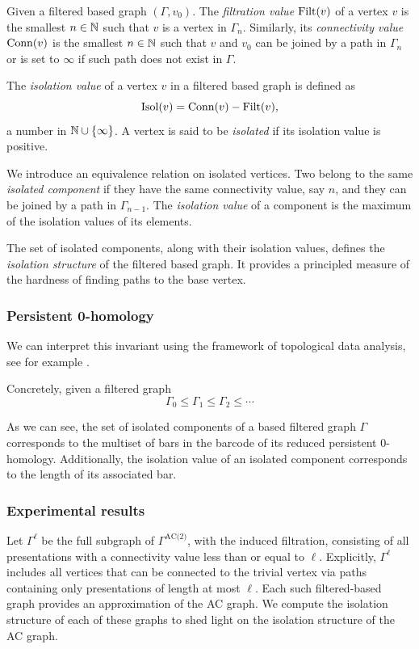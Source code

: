 Given a filtered based graph $(\Gamma, v_0)$.
The \textit{filtration value} $\operatorname{Filt}(v)$ of a vertex $v$ is the smallest $n \in \mathbb{N}$ such that $v$ is a vertex in $\Gamma_n$.
Similarly, its \textit{connectivity value} $\operatorname{Conn}(v)$ is the smallest $n \in \mathbb{N}$ such that $v$ and $v_0$ can be joined by a path in $\Gamma_n$ or is set to $\infty$ if such path does not exist in $\Gamma$.

The \textit{isolation value} of a vertex $v$ in a filtered based graph is defined as
\[
\operatorname{Isol}(v) = \operatorname{Conn}(v) - \operatorname{Filt}(v),
\]
a number in $\mathbb{N} \cup \{\infty\}$.
A vertex is said to be \textit{isolated} if its isolation value is positive.

We introduce an equivalence relation on isolated vertices.
Two belong to the same \textit{isolated component} if they have the same connectivity value, say $n$, and they can be joined by a path in $\Gamma_{n-1}$.
The \textit{isolation value} of a component is the maximum of the isolation values of its elements.

The set of isolated components, along with their isolation values, defines the \textit{isolation structure} of the filtered based graph.
It provides a principled measure of the hardness of finding paths to the base vertex.

\subsubsection{Persistent 0-homology}

We can interpret this invariant using the framework of topological data analysis, see for example \cite{carlsson2022tda}.

Concretely, given a filtered graph
\[
\Gamma_0 \leq \Gamma_1 \leq \Gamma_2 \leq \dotsb
\]


As we can see, the set of isolated components of a based filtered graph $\Gamma$ corresponds to the multiset of bars in the barcode of its reduced persistent $0$-homology.
Additionally, the isolation value of an isolated component corresponds to the length of its associated bar.

\subsubsection{Experimental results}

Let \(\Gamma^\ell\) be the full subgraph of \(\Gamma^{\text{AC(2)}}\), with the induced filtration, consisting of all presentations with a connectivity value less than or equal to \(\ell\).  
Explicitly, \(\Gamma^\ell\) includes all vertices that can be connected to the trivial vertex via paths containing only presentations of length at most \(\ell\).  
Each such filtered-based graph provides an approximation of the AC graph.  
We compute the isolation structure of each of these graphs to shed light on the isolation structure of the AC graph.  


